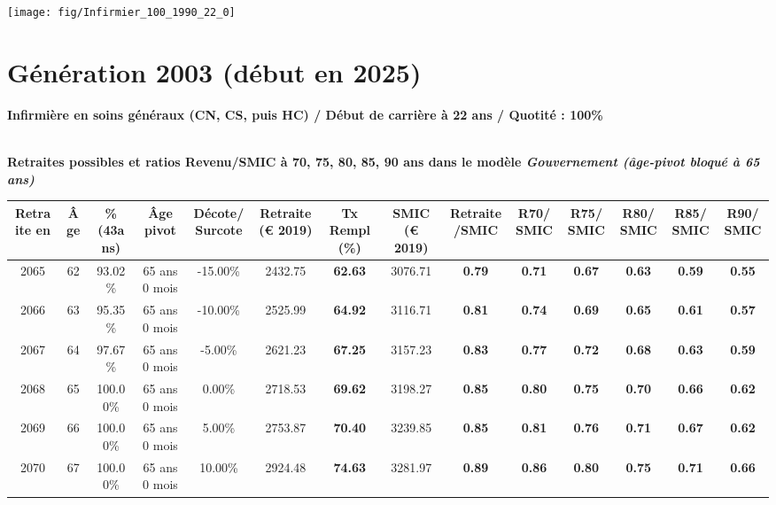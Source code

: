 {\hspace{-2.2cm}\texttt{[image: fig/Infirmier\_100\_1990\_22\_0]}} 

\newpage 
 
\section{Génération 2003 (début en 2025)\label{Infirmier_100_2003_22_0}} 
 
{\bf \noindent Infirmière en soins généraux (CN, CS, puis HC) / Début de carrière à 22 ans / Quotité : 100\%}  ~ 

 ~\\{\bf \noindent Retraites possibles et ratios Revenu/SMIC à 70, 75, 80, 85, 90 ans dans le modèle \emph{Gouvernement (âge-pivot bloqué à 65 ans)}}  
 
\begin{adjustbox}{max width=\textwidth} 
\begin{tabular}[htb]{|c|c||c|c|c||c|c||c|c||c|c|c|c|c|} 
\hline 
 Retraite en &  Âge &  \%(43ans) &  Âge pivot &  Décote/Surcote &  Retraite (\euro{} 2019) &  Tx Rempl(\%) &  SMIC (\euro{} 2019) &  Retraite/SMIC &  R70/SMIC &  R75/SMIC &  R80/SMIC &  R85/SMIC &  R90/SMIC \\ 
\hline \hline 
 2065 &  62 &  93.02\% &  65 ans 0 mois &  -15.00\% &  2432.75 &  {\bf 62.63} &  3076.71 &  {\bf {\color{red} 0.79}} &  {\bf {\color{red} 0.71}} &  {\bf {\color{red} 0.67}} &  {\bf {\color{red} 0.63}} &  {\bf {\color{red} 0.59}} &  {\bf {\color{red} 0.55}} \\ 
\hline 
 2066 &  63 &  95.35\% &  65 ans 0 mois &  -10.00\% &  2525.99 &  {\bf 64.92} &  3116.71 &  {\bf {\color{red} 0.81}} &  {\bf {\color{red} 0.74}} &  {\bf {\color{red} 0.69}} &  {\bf {\color{red} 0.65}} &  {\bf {\color{red} 0.61}} &  {\bf {\color{red} 0.57}} \\ 
\hline 
 2067 &  64 &  97.67\% &  65 ans 0 mois &  -5.00\% &  2621.23 &  {\bf 67.25} &  3157.23 &  {\bf {\color{red} 0.83}} &  {\bf {\color{red} 0.77}} &  {\bf {\color{red} 0.72}} &  {\bf {\color{red} 0.68}} &  {\bf {\color{red} 0.63}} &  {\bf {\color{red} 0.59}} \\ 
\hline 
 2068 &  65 &  100.00\% &  65 ans 0 mois &  0.00\% &  2718.53 &  {\bf 69.62} &  3198.27 &  {\bf {\color{red} 0.85}} &  {\bf {\color{red} 0.80}} &  {\bf {\color{red} 0.75}} &  {\bf {\color{red} 0.70}} &  {\bf {\color{red} 0.66}} &  {\bf {\color{red} 0.62}} \\ 
\hline 
 2069 &  66 &  100.00\% &  65 ans 0 mois &  5.00\% &  2753.87 &  {\bf 70.40} &  3239.85 &  {\bf {\color{red} 0.85}} &  {\bf {\color{red} 0.81}} &  {\bf {\color{red} 0.76}} &  {\bf {\color{red} 0.71}} &  {\bf {\color{red} 0.67}} &  {\bf {\color{red} 0.62}} \\ 
\hline 
 2070 &  67 &  100.00\% &  65 ans 0 mois &  10.00\% &  2924.48 &  {\bf 74.63} &  3281.97 &  {\bf {\color{red} 0.89}} &  {\bf {\color{red} 0.86}} &  {\bf {\color{red} 0.80}} &  {\bf {\color{red} 0.75}} &  {\bf {\color{red} 0.71}} &  {\bf {\color{red} 0.66}} \\ 
\hline 
\hline 
\end{tabular} 
\end{adjustbox} 
 
